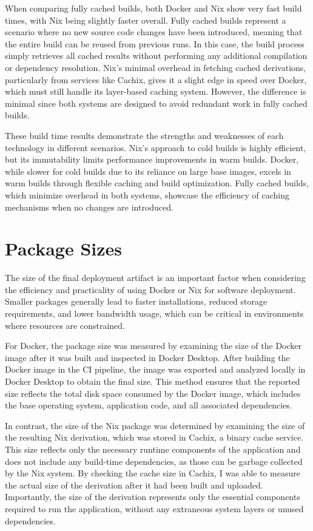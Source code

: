When comparing fully cached builds, both Docker and Nix show very fast build times, with Nix
being slightly faster overall. Fully cached builds represent a scenario where no new source
code changes have been introduced, meaning that the entire build can be reused from previous
runs. In this case, the build process simply retrieves all cached results without performing
any additional compilation or dependency resolution. Nix’s minimal overhead in fetching
cached derivations, particularly from services like Cachix, gives it a slight edge in speed
over Docker, which must still handle its layer-based caching system. However, the difference
is minimal since both systems are designed to avoid redundant work in fully cached builds.

These build time results demonstrate the strengths and weaknesses of each technology in
different scenarios. Nix's approach to cold builds is highly efficient, but its immutability
limits performance improvements in warm builds. Docker, while slower for cold builds due to
its reliance on large base images, excels in warm builds through flexible caching and build
optimization. Fully cached builds, which minimize overhead in both systems, showcase the
efficiency of caching mechanisms when no changes are introduced.

\section{Package Sizes}
The size of the final deployment artifact is an important factor when considering the efficiency
and practicality of using Docker or Nix for software deployment. Smaller packages generally lead
to faster installations, reduced storage requirements, and lower bandwidth usage, which can be
critical in environments where resources are constrained.

For Docker, the package size was measured by examining the size of the Docker image after it
was built and inspected in Docker Desktop. After building the Docker image in the CI pipeline,
the image was exported and analyzed locally in Docker Desktop to obtain the final size. This
method ensures that the reported size reflects the total disk space consumed by the Docker image,
which includes the base operating system, application code, and all associated dependencies.

In contrast, the size of the Nix package was determined by examining the size of the resulting
Nix derivation, which was stored in Cachix, a binary cache service. This size reflects only the
necessary runtime components of the application and does not include any build-time dependencies,
as those can be garbage collected by the Nix system. By checking the cache size in Cachix, I
was able to measure the actual size of the derivation after it had been built and uploaded.
Importantly, the size of the derivation represents only the essential components required to
run the application, without any extraneous system layers or unused dependencies.

